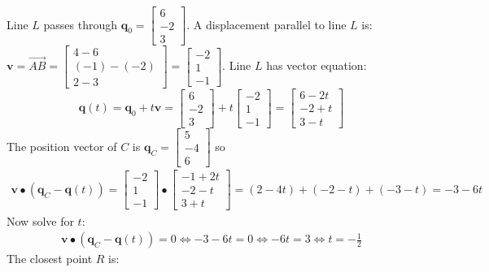 \documentclass{article}
\begin{document}
\begin{itemize}
Line \(L\) passes through \(\mathbf{q}_0 = \begin{bmatrix} 6 \\ -2 \\ 3 \end{bmatrix}\). A displacement parallel to line \(L\) is: \(\mathbf{v} = \overrightarrow{AB} = \begin{bmatrix} 4 - 6 \\ (-1) - (-2) \\ 2 - 3 \end{bmatrix} = \begin{bmatrix} -2 \\ 1 \\ -1 \end{bmatrix}\). Line \(L\) has vector equation: 
\[\mathbf{q}(t) = \mathbf{q}_0 + t \mathbf{v} = \begin{bmatrix} 6 \\ -2 \\ 3 \end{bmatrix} + t\begin{bmatrix} -2 \\ 1 \\ -1 \end{bmatrix} = \begin{bmatrix} 6 - 2t \\ -2 + t \\ 3 - t \end{bmatrix}\]
The position vector of \(C\) is \(\mathbf{q}_C = \begin{bmatrix} 5 \\ -4 \\ 6 \end{bmatrix}\) so 
\begin{align*}
\mathbf{v} \bullet (\mathbf{q}_C - \mathbf{q}(t)) = \begin{bmatrix} -2 \\ 1 \\ -1 \end{bmatrix} \bullet \begin{bmatrix} -1 + 2t \\ -2 - t \\ 3 + t \end{bmatrix} 
= (2 - 4t) + (-2 - t) + (-3 - t) = -3 - 6t
\end{align*}
Now solve for \(t\):
\begin{align*}
\mathbf{v} \bullet (\mathbf{q}_C - \mathbf{q}(t)) = 0 
\iff -3 - 6t = 0 \iff -6t = 3 \iff t = -\frac{1}{2}
\end{align*}
The closest point \(R\) is:

\end{itemize}
\end{document}
